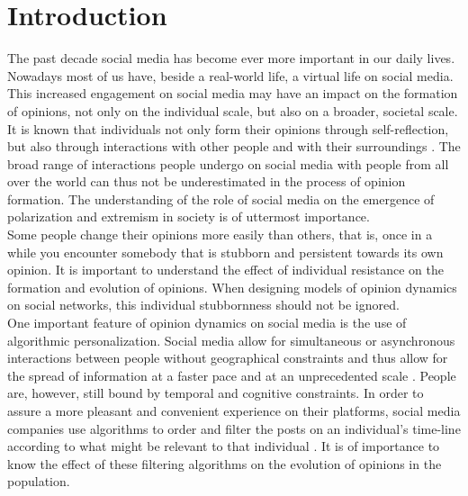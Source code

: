 \documentclass[11 pt , letterpaper , twoside , openright]{book}
\begin{document}
\mainmatter



\pagestyle{fancy}
\fancyhf{}
\lhead{\textcolor{NavyBlue}{\chaptername} \ \textcolor{NavyBlue}{\thechapter}}
\rhead{\rightmark}
\cfoot{\thepage}

\chapter{Introduction}


The past decade social media has become ever more important in our daily lives. Nowadays most of us have, beside a real-world life, a virtual life on social media. This increased engagement on social media may have an impact on the formation of opinions, not only on the individual scale, but also on a broader, societal scale. \\
\newline
It is known that individuals not only form their opinions through self-reflection, but also through interactions with other people and with their surroundings \cite{Perra2019}. The broad range of interactions people undergo on social media with people from all over the world can thus not be underestimated in the process of opinion formation. The understanding of the role of social media on the emergence of polarization and extremism in society is of uttermost importance.\\
\newline
Some people change their opinions more easily than others, that is, once in a while you encounter somebody that is stubborn and persistent towards its own opinion. It is important to understand the effect of individual resistance on the formation and evolution of opinions. When designing models of opinion dynamics on social networks, this individual stubbornness should not be ignored.\\
\newline
One important feature of opinion dynamics on social media is the use of algorithmic personalization. Social media allow for simultaneous or asynchronous interactions between people without geographical constraints and thus allow for the spread of information at a faster pace and at an unprecedented scale \cite{Perra2019}. People are, however, still bound by temporal and cognitive constraints. In order to assure a more pleasant and convenient experience on their platforms, social media companies use algorithms to order and filter the posts on an individual's time-line according to what might be relevant to that individual \cite{Perra2019}. It is of importance to know the effect of these filtering algorithms on the evolution of opinions in the population.\\  
\end{document}
